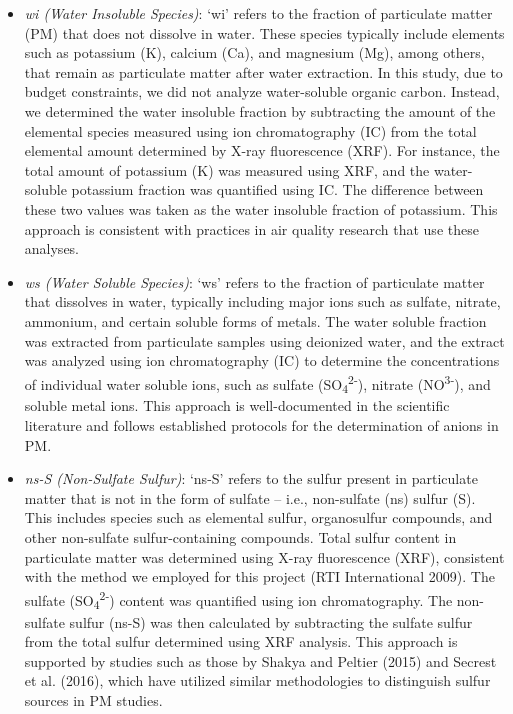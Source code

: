 \documentclass[
  letterpaper,
  DIV=11,
  numbers=noendperiod]{scrartcl}
\begin{document}
\begin{itemize}
\item
  \emph{wi (Water Insoluble Species)}: `wi' refers to
  the fraction of particulate matter (PM) that does not dissolve in
  water. These species typically include elements such as potassium (K),
  calcium (Ca), and magnesium (Mg), among others, that remain as
  particulate matter after water extraction. In this study, due to
  budget constraints, we did not analyze water-soluble organic carbon.
  Instead, we determined the water insoluble fraction by subtracting the
  amount of the elemental species measured using ion chromatography (IC)
  from the total elemental amount determined by X-ray fluorescence
  (XRF). For instance, the total amount of potassium (K) was measured
  using XRF, and the water-soluble potassium fraction was quantified
  using IC. The difference between these two values was taken as the
  water insoluble fraction of potassium. This approach is consistent
  with practices in air quality research that use these analyses.
\item
  \emph{ws (Water Soluble Species)}: `ws' refers to the
  fraction of particulate matter that dissolves in water, typically
  including major ions such as sulfate, nitrate, ammonium, and certain
  soluble forms of metals. The water soluble fraction was extracted from
  particulate samples using deionized water, and the extract was
  analyzed using ion chromatography (IC) to determine the concentrations
  of individual water soluble ions, such as sulfate
  (SO\textsubscript{4}\textsuperscript{2-}), nitrate
  (NO\textsuperscript{3-}), and soluble metal ions. This approach is
  well-documented in the scientific literature and follows established
  protocols for the determination of anions in PM.
\item
  \emph{ns-S (Non-Sulfate Sulfur)}: `ns-S' refers to the sulfur present
  in particulate matter that is not in the form of sulfate -- i.e.,
  non-sulfate (ns) sulfur (S). This includes species such as elemental
  sulfur, organosulfur compounds, and other non-sulfate
  sulfur-containing compounds. Total sulfur content in particulate
  matter was determined using X-ray fluorescence (XRF), consistent with
  the method we employed for this project (RTI International 2009). The
  sulfate (SO\textsubscript{4}\textsuperscript{2-}) content was
  quantified using ion chromatography. The non-sulfate sulfur (ns-S) was
  then calculated by subtracting the sulfate sulfur from the total
  sulfur determined using XRF analysis. This approach is supported by
  studies such as those by Shakya and Peltier (2015) and Secrest et al.
  (2016), which have utilized similar methodologies to distinguish
  sulfur sources in PM studies.
\end{itemize}
\end{document}
